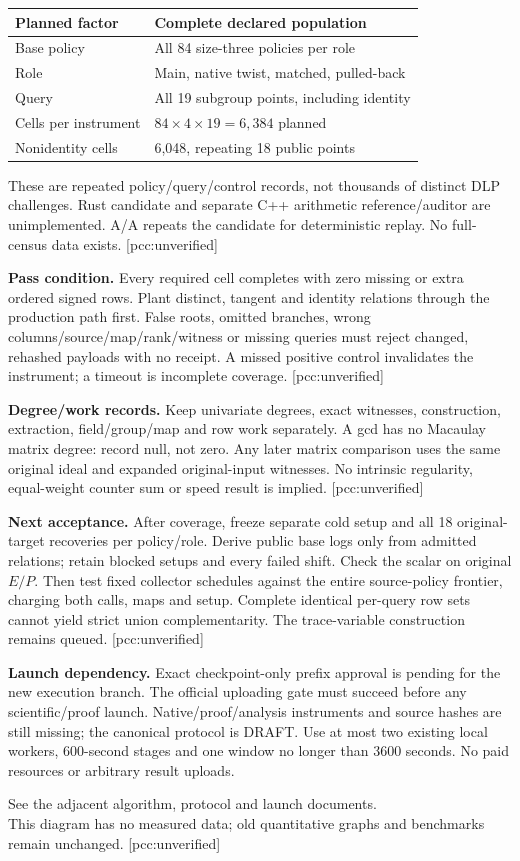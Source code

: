 \documentclass[11pt]{article}
\begin{document}
\begin{center}\begin{tabular}{ll}\toprule
Planned factor & Complete declared population\\\midrule
Base policy & All 84 size-three policies per role\\
Role & Main, native twist, matched, pulled-back\\
Query & All 19 subgroup points, including identity\\
Cells per instrument & $84\times4\times19=6,384$ planned\\
Nonidentity cells & 6,048, repeating 18 public points\\\bottomrule
\end{tabular}\end{center}
These are repeated policy/query/control records, not thousands of distinct
DLP challenges. Rust candidate and separate C++ arithmetic reference/auditor
are unimplemented. A/A repeats the candidate for deterministic replay.
No full-census data exists. [pcc:unverified]

\textbf{Pass condition.} Every required cell completes with zero missing or
extra ordered signed rows. Plant distinct, tangent and identity relations
through the production path first. False roots, omitted branches, wrong
columns/source/map/rank/witness or missing queries must reject changed,
rehashed payloads with no receipt. A missed positive control invalidates the
instrument; a timeout is incomplete coverage. [pcc:unverified]

\textbf{Degree/work records.} Keep univariate degrees, exact witnesses,
construction, extraction, field/group/map and row work separately. A gcd has
no Macaulay matrix degree: record null, not zero. Any later matrix comparison
uses the same original ideal and expanded original-input witnesses. No
intrinsic regularity, equal-weight counter sum or speed result is implied.
[pcc:unverified]

\textbf{Next acceptance.} After coverage, freeze separate cold setup and all 18
original-target recoveries per policy/role. Derive public base logs only from
admitted relations; retain blocked setups and every failed shift. Check the
scalar on original $E/P$. Then test fixed collector schedules against the
entire source-policy frontier, charging both calls, maps and setup. Complete
identical per-query row sets cannot yield strict union complementarity.
The trace-variable construction remains queued. [pcc:unverified]

\textbf{Launch dependency.} Exact checkpoint-only prefix approval is pending
for the new execution branch. The official uploading gate must succeed before
any scientific/proof launch. Native/proof/analysis instruments and source hashes
are still missing; the canonical protocol is DRAFT. Use at most two existing
local workers, 600-second stages and one window no longer than 3600 seconds.
No paid resources or arbitrary result uploads.

\small See the adjacent algorithm, protocol and launch documents.\\
This diagram has no measured data; old quantitative graphs and benchmarks
remain unchanged. [pcc:unverified]
\end{document}
